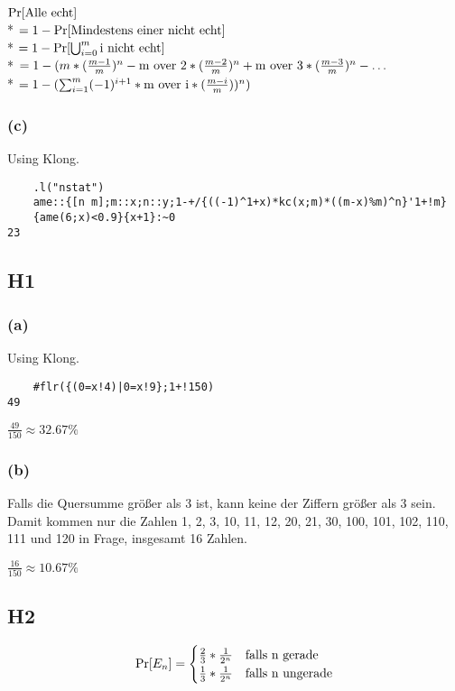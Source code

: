 \documentclass{article}
\begin{document}
$ \Pr[\hbox{Alle echt}] $ \\*
$ = 1-\Pr[\hbox{Mindestens einer nicht echt}] $ \\*
$ = 1-\Pr[\bigcup_{i=0}^{m} \hbox{i nicht echt}] $ \\*
$ = 1-(m*(\frac{m-1}{m})^n-\hbox{m over 2}*(\frac{m-2}{m})^n+\hbox{m over 3}*(\frac{m-3}{m})^n-\dots $ \\*
$ = 1-(\sum_{i=1}^{m}(-1)^{i+1}*\hbox{m over i}*(\frac{m-i}{m}))^n) $

\subsubsection*{(c)}

Using Klong.

\begin{lstlisting}
	.l("nstat")
	ame::{[n m];m::x;n::y;1-+/{((-1)^1+x)*kc(x;m)*((m-x)%m)^n}'1+!m}
	{ame(6;x)<0.9}{x+1}:~0
23
\end{lstlisting}

\subsection*{H1}

\subsubsection*{(a)}

Using Klong.

\begin{lstlisting}
	#flr({(0=x!4)|0=x!9};1+!150)
49
\end{lstlisting}

$\frac{49}{150} \approx 32.67\% $

\subsubsection*{(b)}

Falls die Quersumme größer als 3 ist, kann keine der Ziffern größer
als 3 sein. Damit kommen nur die Zahlen 1, 2, 3, 10, 11, 12, 20, 21,
30, 100, 101, 102, 110, 111 und 120 in Frage, insgesamt 16 Zahlen.

$\frac{16}{150} \approx 10.67\% $

\subsection*{H2}

$$\Pr[E_n]=\begin{cases}\frac{2}{3}*\frac{1}{2^n} & \hbox{falls n gerade}\cr
		  \frac{1}{3}*\frac{1}{2^n} & \hbox{falls n ungerade}\end{cases}$$
\end{document}
